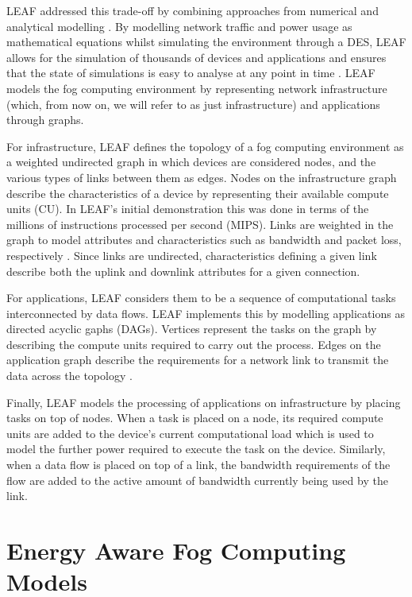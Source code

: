 \documentclass{l4proj}
\begin{document}
LEAF addressed this trade-off by combining approaches from numerical and analytical modelling \citep{leafMasters}.
By modelling network traffic and power usage as mathematical equations whilst simulating the environment through a DES, LEAF allows for the simulation of thousands of devices and applications and ensures that the state of simulations is easy to analyse at any point in time \citep{leafMasters}.
LEAF models the fog computing environment by representing network infrastructure (which, from now on, we will refer to as just infrastructure) and applications through graphs.

For infrastructure, LEAF defines the topology of a fog computing environment as a weighted undirected graph in which devices are considered nodes, and the various types of links between them as edges.
Nodes on the infrastructure graph describe the characteristics of a device by representing their available compute units (CU).
In LEAF's initial demonstration this was done in terms of the millions of instructions processed per second (MIPS).
Links are weighted in the graph to model attributes and characteristics such as bandwidth and packet loss, respectively \citep{leaf2021}.
Since links are undirected, characteristics defining a given link describe both the uplink and downlink attributes for a given connection.

For applications, LEAF considers them to be a sequence of computational tasks interconnected by data flows.
LEAF implements this by modelling applications as directed acyclic gaphs (DAGs).
Vertices represent the tasks on the graph by describing the compute units required to carry out the process.
Edges on the application graph describe the requirements for a network link to transmit the data across the topology \citep{leaf2021}.

Finally, LEAF models the processing of applications on infrastructure by placing tasks on top of nodes.
When a task is placed on a node, its required compute units are added to the device's current computational load which is used to model the further power required to execute the task on the device.
Similarly, when a data flow is placed on top of a link, the bandwidth requirements of the flow are added to the active amount of bandwidth currently being used by the link.

\section{Energy Aware Fog Computing Models}\label{relWork:sec:models}
\end{document}
